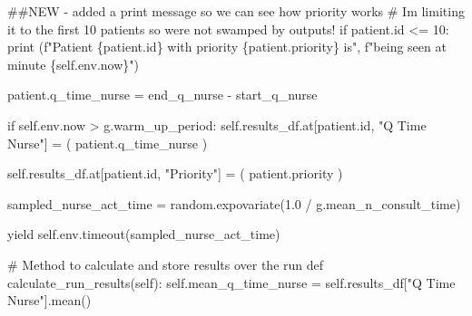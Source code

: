 \documentclass[
  letterpaper,
  DIV=11,
  numbers=noendperiod]{scrreprt}
\newenvironment{Shaded}{}{}
\newcommand{\BuiltInTok}[1]{\textcolor[rgb]{0.84,0.23,0.29}{#1}}
\newcommand{\CommentTok}[1]{\textcolor[rgb]{0.42,0.45,0.49}{#1}}
\newcommand{\ControlFlowTok}[1]{\textcolor[rgb]{0.84,0.23,0.29}{#1}}
\newcommand{\DecValTok}[1]{\textcolor[rgb]{0.00,0.36,0.77}{#1}}
\newcommand{\FloatTok}[1]{\textcolor[rgb]{0.00,0.36,0.77}{#1}}
\newcommand{\KeywordTok}[1]{\textcolor[rgb]{0.84,0.23,0.29}{#1}}
\newcommand{\NormalTok}[1]{\textcolor[rgb]{0.14,0.16,0.18}{#1}}
\newcommand{\OperatorTok}[1]{\textcolor[rgb]{0.14,0.16,0.18}{#1}}
\newcommand{\SpecialCharTok}[1]{\textcolor[rgb]{0.00,0.36,0.77}{#1}}
\newcommand{\SpecialStringTok}[1]{\textcolor[rgb]{0.01,0.18,0.38}{#1}}
\newcommand{\StringTok}[1]{\textcolor[rgb]{0.01,0.18,0.38}{#1}}
\newcommand{\VariableTok}[1]{\textcolor[rgb]{0.89,0.38,0.04}{#1}}
\begin{document}
\begin{tcolorbox}
\begin{Shaded}
\begin{Highlighting}[]
            \CommentTok{\#\#NEW {-} added a print message so we can see how priority works}
            \CommentTok{\# I\textquotesingle{}m limiting it to the first 10 patients so we\textquotesingle{}re not swamped by outputs!}
            \ControlFlowTok{if}\NormalTok{ patient.}\BuiltInTok{id} \OperatorTok{\textless{}=} \DecValTok{10}\NormalTok{:}
                \BuiltInTok{print}\NormalTok{ (}\SpecialStringTok{f"Patient }\SpecialCharTok{\{}\NormalTok{patient}\SpecialCharTok{.}\BuiltInTok{id}\SpecialCharTok{\}}\SpecialStringTok{ with priority }\SpecialCharTok{\{}\NormalTok{patient}\SpecialCharTok{.}\NormalTok{priority}\SpecialCharTok{\}}\SpecialStringTok{ is"}\NormalTok{,}
                    \SpecialStringTok{f"being seen at minute }\SpecialCharTok{\{}\VariableTok{self}\SpecialCharTok{.}\NormalTok{env}\SpecialCharTok{.}\NormalTok{now}\SpecialCharTok{\}}\SpecialStringTok{"}\NormalTok{)}

\NormalTok{            patient.q\_time\_nurse }\OperatorTok{=}\NormalTok{ end\_q\_nurse }\OperatorTok{{-}}\NormalTok{ start\_q\_nurse}

            \ControlFlowTok{if} \VariableTok{self}\NormalTok{.env.now }\OperatorTok{\textgreater{}}\NormalTok{ g.warm\_up\_period:}
                \VariableTok{self}\NormalTok{.results\_df.at[patient.}\BuiltInTok{id}\NormalTok{, }\StringTok{"Q Time Nurse"}\NormalTok{] }\OperatorTok{=}\NormalTok{ (}
\NormalTok{                    patient.q\_time\_nurse}
\NormalTok{                )}

                \VariableTok{self}\NormalTok{.results\_df.at[patient.}\BuiltInTok{id}\NormalTok{, }\StringTok{"Priority"}\NormalTok{] }\OperatorTok{=}\NormalTok{ (}
\NormalTok{                    patient.priority}
\NormalTok{                )}

\NormalTok{            sampled\_nurse\_act\_time }\OperatorTok{=}\NormalTok{ random.expovariate(}\FloatTok{1.0} \OperatorTok{/}
\NormalTok{                                                        g.mean\_n\_consult\_time)}

            \ControlFlowTok{yield} \VariableTok{self}\NormalTok{.env.timeout(sampled\_nurse\_act\_time)}

    \CommentTok{\# Method to calculate and store results over the run}
    \KeywordTok{def}\NormalTok{ calculate\_run\_results(}\VariableTok{self}\NormalTok{):}
        \VariableTok{self}\NormalTok{.mean\_q\_time\_nurse }\OperatorTok{=} \VariableTok{self}\NormalTok{.results\_df[}\StringTok{"Q Time Nurse"}\NormalTok{].mean()}


\end{Highlighting}
\end{Shaded}
\end{tcolorbox}
\end{document}
